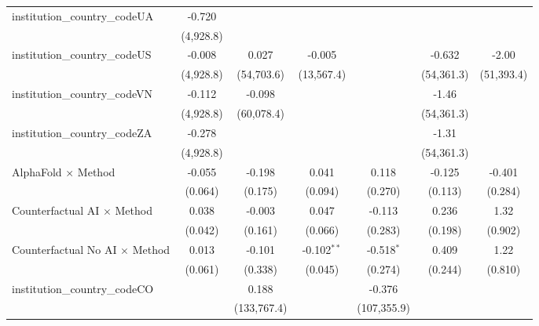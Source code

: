 \begin{tabular}{lcccccc}
   institution\_country\_codeUA          & -0.720        &             &               &              &              &   \\   
                                         & (4,928.8)     &             &               &              &              &   \\   
   institution\_country\_codeUS          & -0.008        & 0.027       & -0.005        &              & -0.632       & -2.00\\   
                                         & (4,928.8)     & (54,703.6)  & (13,567.4)    &              & (54,361.3)   & (51,393.4)\\   
   institution\_country\_codeVN          & -0.112        & -0.098      &               &              & -1.46        &   \\   
                                         & (4,928.8)     & (60,078.4)  &               &              & (54,361.3)   &   \\   
   institution\_country\_codeZA          & -0.278        &             &               &              & -1.31        &   \\   
                                         & (4,928.8)     &             &               &              & (54,361.3)   &   \\   
   AlphaFold $\times$ Method             & -0.055        & -0.198      & 0.041         & 0.118        & -0.125       & -0.401\\   
                                         & (0.064)       & (0.175)     & (0.094)       & (0.270)      & (0.113)      & (0.284)\\   
   Counterfactual AI $\times$ Method     & 0.038         & -0.003      & 0.047         & -0.113       & 0.236        & 1.32\\   
                                         & (0.042)       & (0.161)     & (0.066)       & (0.283)      & (0.198)      & (0.902)\\   
   Counterfactual No AI $\times$ Method  & 0.013         & -0.101      & -0.102$^{**}$ & -0.518$^{*}$ & 0.409        & 1.22\\   
                                         & (0.061)       & (0.338)     & (0.045)       & (0.274)      & (0.244)      & (0.810)\\   
   institution\_country\_codeCO          &               & 0.188       &               & -0.376       &              &   \\   
                                         &               & (133,767.4) &               & (107,355.9)  &              &   \\   

\end{tabular}

